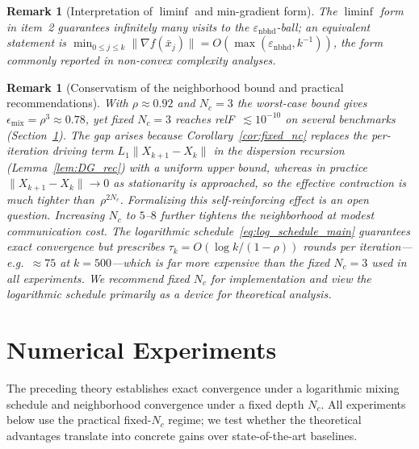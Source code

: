 \documentclass[10pt,twocolumn,letterpaper]{article}
\def\cO{O}%
\theoremstyle{compact}
\theoremstyle{compactremark}
\newtheorem{remark}[theorem]{Remark}
\newcommand{\cO}{\mathcal{O}}
\begin{document}
\begin{remark}[Interpretation of $\liminf$ and min-gradient form]
The $\liminf$ form in item~2 guarantees infinitely many visits to
the $\varepsilon_{\mathrm{nbhd}}$-ball; an equivalent statement is
$\min_{0\le j\le k}\|\nabla f(\bar x_j)\|
=\cO(\max(\varepsilon_{\mathrm{nbhd}}, k^{-1}))$,
the form commonly reported in non-convex complexity analyses.
\end{remark}

\begin{remark}[Conservatism of the neighborhood bound and practical recommendations]\label{rem:practical_implications}
With $\rho\approx 0.92$ and $N_c=3$ the worst-case bound gives
$\epsilon_{\mathrm{mix}}=\rho^3\approx 0.78$, yet fixed $N_c{=}3$
reaches relF~$\lesssim 10^{-10}$ on several benchmarks
(Section~\ref{sec:experiments}).
The gap arises because Corollary~\ref{cor:fixed_nc} replaces the
per-iteration driving term $L_1\|X_{k+1}{-}X_k\|$ in the
dispersion recursion (Lemma~\ref{lem:DG_rec}) with a \emph{uniform}
upper bound, whereas in practice
$\|X_{k+1}{-}X_k\|\to 0$ as stationarity is approached, so the
effective contraction is much tighter than~$\rho^{2N_c}$.
Formalizing this self-reinforcing effect is an open question.
Increasing $N_c$ to $5$--$8$ further tightens the neighborhood at
modest communication cost.
The logarithmic schedule~\eqref{eq:log_schedule_main} guarantees
exact convergence but prescribes $\tau_k=\cO(\log k/(1{-}\rho))$
rounds per iteration---e.g.\ ${\approx}75$ at $k{=}500$---which is
far more expensive than the fixed $N_c{=}3$ used in all experiments.
We recommend fixed $N_c$ for implementation and view the
logarithmic schedule primarily as a device for theoretical analysis.
\end{remark}




\section{Numerical Experiments}\label{sec:experiments}
	
	The preceding theory establishes exact convergence under a
	logarithmic mixing schedule and neighborhood convergence under
	a fixed depth $N_c$.
	All experiments below use the practical fixed-$N_c$ regime;
	we test whether the theoretical advantages translate
	into concrete gains over state-of-the-art baselines.
	
\end{document}
